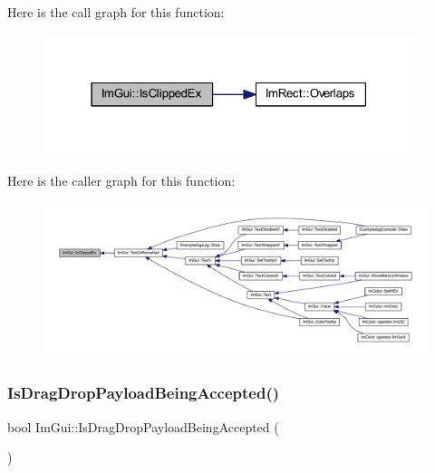 Here is the call graph for this function\+:
\nopagebreak
\begin{figure}[H]
\begin{center}
\leavevmode
\includegraphics[width=307pt]{namespace_im_gui_a8674467ae34d04bc99df1f7f98f47407_cgraph}
\end{center}
\end{figure}
Here is the caller graph for this function\+:
\nopagebreak
\begin{figure}[H]
\begin{center}
\leavevmode
\includegraphics[width=350pt]{namespace_im_gui_a8674467ae34d04bc99df1f7f98f47407_icgraph}
\end{center}
\end{figure}
\mbox{\label{namespace_im_gui_a673042a1ed3eeb3c19781faed83ad4a8}} 
\subsubsection{\texorpdfstring{Is\+Drag\+Drop\+Payload\+Being\+Accepted()}{IsDragDropPayloadBeingAccepted()}}
{\footnotesize\ttfamily bool Im\+Gui\+::\+Is\+Drag\+Drop\+Payload\+Being\+Accepted (\begin{DoxyParamCaption}{ }\end{DoxyParamCaption})}

\mbox{\label{namespace_im_gui_a2d8ac4569456a8003e4dddd39caf771c}} 
